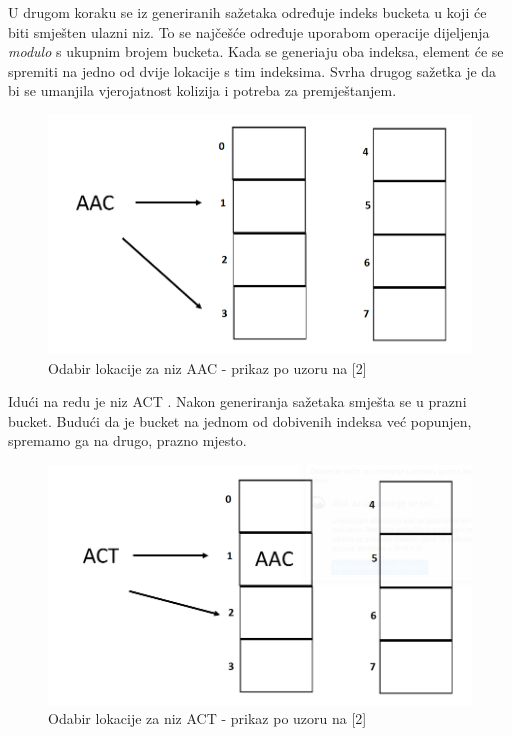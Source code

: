 \documentclass[times, utf8, seminar, numeric]{fer}
\begin{document}
U drugom koraku se iz generiranih sažetaka određuje indeks bucketa u koji će biti smješten ulazni niz. To se najčešće određuje uporabom operacije dijeljenja \textit{modulo} s ukupnim brojem bucketa. Kada se generiaju oba indeksa, element će se spremiti na jedno od dvije lokacije s tim indeksima. Svrha drugog sažetka je da bi se umanjila vjerojatnost kolizija i potreba za premještanjem. 


\begin{figure}[H]
  \centering
  \setlength{\intextsep}{5pt}
  \includegraphics[scale = 0.4]{images/insertion1.png}
  \caption{Odabir lokacije za niz AAC - prikaz po uzoru na [2]}
  \label{fig_insert1}
\end{figure}
Idući na redu je niz ACT . Nakon generiranja sažetaka smješta se u prazni bucket. Budući da je bucket na jednom od dobivenih indeksa već popunjen, spremamo ga na drugo, prazno mjesto.
\begin{figure}[H]
  \centering
  \setlength{\intextsep}{5pt}
  \includegraphics[scale = 0.4]{images/insertion2.png}
  \caption{Odabir lokacije za niz ACT - prikaz po uzoru na [2]}
  \label{fig_insert2}
\end{figure}
\end{document}
